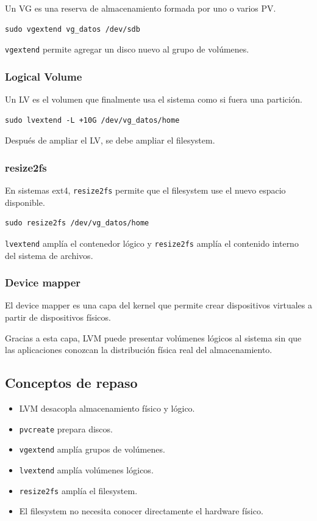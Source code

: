 \documentclass[11pt, letterpaper]{article}
\begin{document}
Un VG es una reserva de almacenamiento formada por uno o varios PV.

\begin{verbatim}
sudo vgextend vg_datos /dev/sdb
\end{verbatim}

\texttt{vgextend} permite agregar un disco nuevo al grupo de volúmenes.
\subsubsection{Logical Volume}
\label{sec:org77173f8}

Un LV es el volumen que finalmente usa el sistema como si fuera una partición.

\begin{verbatim}
sudo lvextend -L +10G /dev/vg_datos/home
\end{verbatim}

Después de ampliar el LV, se debe ampliar el filesystem.
\subsubsection{resize2fs}
\label{sec:org07d276b}

En sistemas ext4, \texttt{resize2fs} permite que el filesystem use el nuevo espacio disponible.

\begin{verbatim}
sudo resize2fs /dev/vg_datos/home
\end{verbatim}

\texttt{lvextend} amplía el contenedor lógico y \texttt{resize2fs} amplía el contenido interno del sistema de archivos.
\subsubsection{Device mapper}
\label{sec:org74d9f69}

El device mapper es una capa del kernel que permite crear dispositivos virtuales a partir de dispositivos físicos.

Gracias a esta capa, LVM puede presentar volúmenes lógicos al sistema sin que las aplicaciones conozcan la distribución física real del almacenamiento.
\subsection{Conceptos de repaso}
\label{sec:org0a74afd}

\begin{itemize}
\item LVM desacopla almacenamiento físico y lógico.
\item \texttt{pvcreate} prepara discos.
\item \texttt{vgextend} amplía grupos de volúmenes.
\item \texttt{lvextend} amplía volúmenes lógicos.
\item \texttt{resize2fs} amplía el filesystem.
\item El filesystem no necesita conocer directamente el hardware físico.
\end{itemize}
\end{document}
